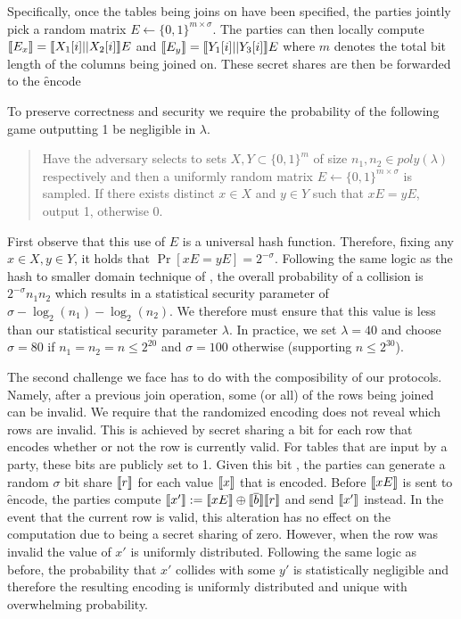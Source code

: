 Specifically, once the tables being joins on have been specified, the parties jointly pick a random matrix $E\gets\{0,1\}^{m\times \sigma}$. The parties can then locally compute $\llbracket E_x\rrbracket=\llbracket X_1[i] || X_2[i]\rrbracket E$ and $\llbracket E_y\rrbracket=\llbracket Y_1[i] || Y_3[i]\rrbracket E$ where $m$ denotes the total bit length of the columns being joined on. These secret shares are then be forwarded to the \f{encode}

To preserve correctness and security we require the probability of the following game outputting 1 be negligible in $\lambda$. 
\begin{quote}
Have the adversary selects to sets $X,Y\subset \{0,1\}^{m}$ of size $n_1,n_2\in poly(\lambda)$  respectively and then a uniformly random matrix $E\gets \{0,1\}^{m\times \sigma}$ is sampled. If there exists distinct $x\in X$ and $y\in Y$ such that $xE = yE$, output 1, otherwise 0. 
\end{quote}

First observe that this use of $E$ is a universal hash function. Therefore, fixing any $x\in X, y\in Y$, it holds that $\Pr[xE=yE]=2^{-\sigma}$. Following the same logic as the hash to smaller domain technique of \cite{usenix:PSZ14,CLR17}, the overall probability of a collision is $2^{-\sigma}n_1n_2$ which results in a statistical security parameter of $\sigma -\log_2(n_1)-\log_2(n_2)$. We therefore must ensure that this value is less than our statistical  security parameter $\lambda$. In practice, we set $\lambda=40$ and choose $\sigma =80$ if $n_1=n_2=n\leq 2^{20}$ and $\sigma=100$ otherwise (supporting $n\leq 2^{30}$). 



The second challenge we face has to do with the composibility of our protocols. Namely, after a previous join operation, some (or all) of the rows being joined can be invalid. We require that the randomized encoding does not reveal which rows are invalid. This is achieved by secret sharing a bit for each row that encodes whether or not the row is currently valid. For tables that are input by a party, these bits are publicly set to 1. Given this bit , the parties can generate a random $\sigma$ bit share $\llbracket r\rrbracket$ for each value $\llbracket x\rrbracket$ that is encoded. Before $\llbracket xE\rrbracket$ is sent to \f{encode}, the parties compute $\llbracket x'\rrbracket:=\llbracket xE\rrbracket\oplus \llbracket \overline{b}\rrbracket\llbracket r\rrbracket$ and send $\llbracket x'\rrbracket$ instead. In the event that the current row is valid, this alteration has no effect on the computation due to  being a secret sharing of zero. However, when the row was invalid the value of $x'$ is uniformly distributed. Following the same logic as before, the probability that $x'$ collides with some $y'$ is statistically negligible and therefore the resulting encoding is uniformly distributed and unique with overwhelming probability. 

